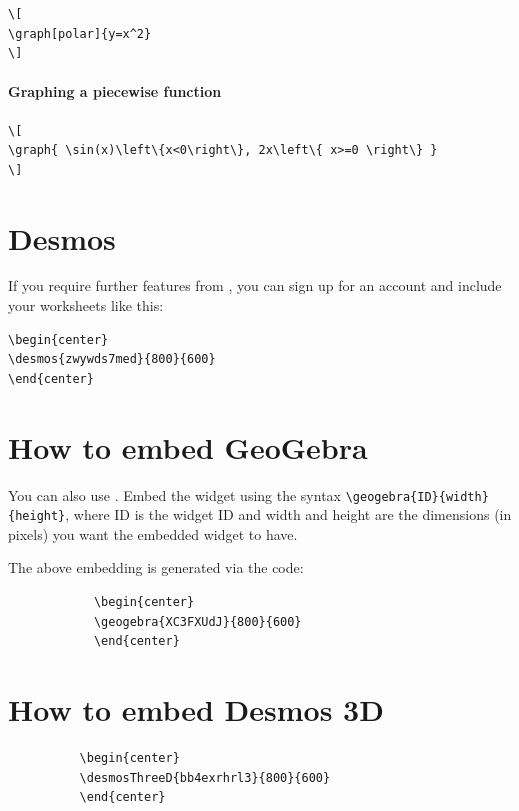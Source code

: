 \documentclass{ximera}
\begin{document}
\begin{verbatim}
\[
\graph[polar]{y=x^2}
\]
\end{verbatim}
\paragraph{Graphing a piecewise function}


\begin{verbatim}
\[
\graph{ \sin(x)\left\{x<0\right\}, 2x\left\{ x>=0 \right\} }
\]
\end{verbatim}


\section{Desmos}

If you require further features from
, you can sign up for an account
and include your worksheets like this:

\begin{verbatim}
\begin{center}
\desmos{zwywds7med}{800}{600}
\end{center}
\end{verbatim}
\begin{center}
\end{center}


  \section{How to embed GeoGebra}

        You can also use . Embed the
        widget using the syntax \verb|\geogebra{ID}{width}{height}|, where ID
        is the widget ID and width and height are the dimensions (in pixels)
        you want the embedded widget to have.
        
    
        \begin{center}
        \end{center}
        
        The above embedding is generated via the code:
        
        \begin{verbatim}
            \begin{center}
            \geogebra{XC3FXUdJ}{800}{600}
            \end{center}
        \end{verbatim}      

        \section{How to embed Desmos 3D}

        \begin{center}
        \end{center}
        \begin{verbatim}
          \begin{center}
          \desmosThreeD{bb4exrhrl3}{800}{600}
          \end{center}
      \end{verbatim}    
      
\end{document}
